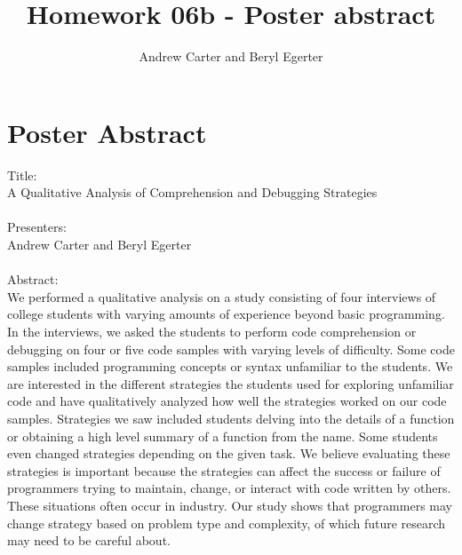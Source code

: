 \documentclass{article}
\title{Homework 06b - Poster abstract}
\author{Andrew Carter and Beryl Egerter}
\begin{document}
\maketitle
\section{Poster Abstract}
Title: \\  A Qualitative Analysis of Comprehension and Debugging Strategies \\ \\
Presenters: \\ Andrew Carter and Beryl Egerter \\ \\
Abstract: \\
We performed a qualitative analysis on a study consisting of four interviews of college students with varying amounts of experience beyond basic programming. In the interviews, we asked the students to perform code comprehension or debugging on four or five code samples with varying levels of difficulty. Some code samples included programming concepts or syntax unfamiliar to the students. We are interested in the different strategies the students used for exploring unfamiliar code and have qualitatively analyzed how well the strategies worked on our code samples. Strategies we saw included students delving into the details of a function or obtaining a high level summary of a function from the name. Some students even changed strategies depending on the given task. We believe evaluating these strategies is important because the strategies can affect the success or failure of programmers trying to maintain, change, or interact with code written by others. These situations often occur in industry. Our study shows that programmers may change strategy based on problem type and complexity, of which future research may need to be careful about.
\end{document}
